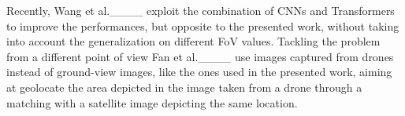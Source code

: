 Recently, Wang et al.____ exploit the combination of CNNs and Transformers to improve the performances, but opposite to the presented work, without taking into account the generalization on different FoV values. Tackling the problem from a different point of view Fan et al.____ use images captured from drones instead of ground-view images, like the ones used in the presented work, aiming at geolocate the area depicted in the image taken from a drone through a matching with a satellite image depicting the same location.
